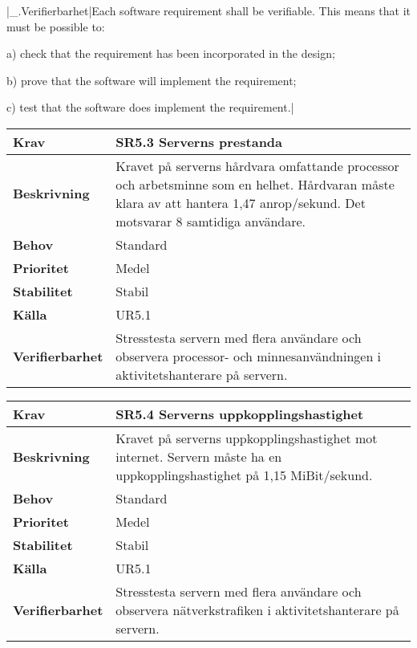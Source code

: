 \documentclass[a4paper, twoside, 11pt, titlepage]{article}
\begin{document}
|\_.Verifierbarhet|Each software requirement shall be verifiable. This means that it must be possible to:

a) check that the requirement has been incorporated in the design;

b) prove that the software will implement the requirement;

c) test that the software does implement the requirement.|

\begin{tabular} { p{2.6cm} p{12.5cm} }
	\hline
	\sffamily\textbf{Krav} & \sffamily\textbf{SR5.3 Serverns prestanda } \\
	\hline
	\sffamily\textbf{Beskrivning} & Kravet på serverns hårdvara omfattande processor och arbetsminne som en helhet. Hårdvaran måste klara av att hantera 1,47 anrop/sekund. Det motsvarar 8 samtidiga användare.  \\
	\hline
	\sffamily\textbf{Behov} & Standard  \\
	\hline
	\sffamily\textbf{Prioritet} & Medel  \\
	\hline
	\sffamily\textbf{Stabilitet} & Stabil  \\
	\hline
	\sffamily\textbf{Källa} & UR5.1  \\
	\hline
	\sffamily\textbf{Verifierbarhet} & Stresstesta servern med flera användare och observera processor- och minnesanvändningen i aktivitetshanterare på servern.  \\
	\hline
\end{tabular}
\vspace{6mm}

\begin{tabular} { p{2.6cm} p{12.5cm} }
	\hline
	\sffamily\textbf{Krav} & \sffamily\textbf{SR5.4 Serverns uppkopplingshastighet } \\
	\hline
	\sffamily\textbf{Beskrivning} & Kravet på serverns uppkopplingshastighet mot internet. Servern måste ha en uppkopplingshastighet på 1,15 MiBit/sekund.  \\
	\hline
	\sffamily\textbf{Behov} & Standard  \\
	\hline
	\sffamily\textbf{Prioritet} & Medel  \\
	\hline
	\sffamily\textbf{Stabilitet} & Stabil  \\
	\hline
	\sffamily\textbf{Källa} & UR5.1  \\
	\hline
	\sffamily\textbf{Verifierbarhet} & Stresstesta servern med flera användare och observera nätverkstrafiken i aktivitetshanterare på servern.  \\
	\hline
\end{tabular}
\end{document}
